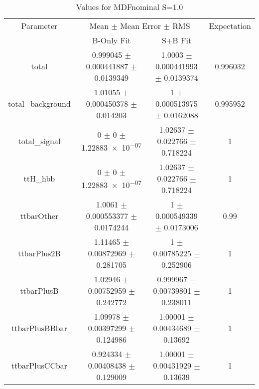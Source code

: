 \begin{table}
\centering
\caption{Values for MDFnominal S=1.0}
\begin{tabular}{cccc}
\toprule
Parameter & \multicolumn{2}{c}{Mean $\pm$ Mean Error $\pm$ RMS} & Expectation\\
 & B-Only Fit & S+B Fit & \\
\midrule
total & \num{0.999045} $\pm$ \num{0.000441887} $\pm$ \num{0.0139349} & \num{1.0003} $\pm$ \num{0.000441993} $\pm$ \num{0.0139374} & \num{0.996032}\\
total\_background & \num{1.01055} $\pm$ \num{0.000450378} $\pm$ \num{0.014203} & \num{1} $\pm$ \num{0.000513975} $\pm$ \num{0.0162088} & \num{0.995952}\\
total\_signal & \num{0} $\pm$ \num{0} $\pm$ \num{1.22883e-07} & \num{1.02637} $\pm$ \num{0.022766} $\pm$ \num{0.718224} & \num{1}\\
ttH\_hbb & \num{0} $\pm$ \num{0} $\pm$ \num{1.22883e-07} & \num{1.02637} $\pm$ \num{0.022766} $\pm$ \num{0.718224} & \num{1}\\
ttbarOther & \num{1.0061} $\pm$ \num{0.000553377} $\pm$ \num{0.0174244} & \num{1} $\pm$ \num{0.000549339} $\pm$ \num{0.0173006} & \num{0.99}\\
ttbarPlus2B & \num{1.11465} $\pm$ \num{0.00872969} $\pm$ \num{0.281705} & \num{1} $\pm$ \num{0.00785225} $\pm$ \num{0.252906} & \num{1}\\
ttbarPlusB & \num{1.02946} $\pm$ \num{0.00752959} $\pm$ \num{0.242772} & \num{0.999967} $\pm$ \num{0.00739801} $\pm$ \num{0.238011} & \num{1}\\
ttbarPlusBBbar & \num{1.09978} $\pm$ \num{0.00397299} $\pm$ \num{0.124986} & \num{1.00001} $\pm$ \num{0.00434689} $\pm$ \num{0.13692} & \num{1}\\
ttbarPlusCCbar & \num{0.924334} $\pm$ \num{0.00408438} $\pm$ \num{0.129009} & \num{1.00001} $\pm$ \num{0.00431929} $\pm$ \num{0.13639} & \num{1}\\
\bottomrule
\end{tabular}
\end{table}